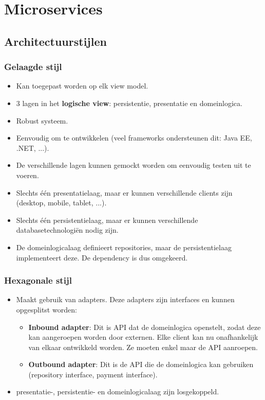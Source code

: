 \part{Microservices}
	\chapter{Architectuurstijlen}
	
	\section{Gelaagde stijl}
		\begin{itemize}
			\item Kan toegepast worden op elk view model.
			\item 3 lagen in het \textbf{logische view}: persistentie, presentatie en domeinlogica.
			\item[\good] Robust systeem.
			\item[\good] Eenvoudig om te ontwikkelen (veel frameworks ondersteunen dit: Java EE, .NET, ...).
			\item[\good] De verschillende lagen kunnen gemockt worden om eenvoudig testen uit te voeren.
			\item[\alert] Slechts één presentatielaag, maar er kunnen verschillende clients zijn (desktop, mobile, tablet, ...).
			\item[\alert] Slechts één persistentielaag, maar er kunnen verschillende databasetechnologiën nodig zijn.
			\item[\alert] De domeinlogicalaag definieert repositories, maar de persistentielaag implementeert deze. De dependency is dus omgekeerd.
		\end{itemize}
	\section{Hexagonale stijl}
		\begin{itemize}
			\item Maakt gebruik van adapters. Deze adapters zijn interfaces en kunnen opgesplitst worden:
			\begin{itemize}
				\item \textbf{Inbound adapter}: Dit is API dat de domeinlogica openstelt, zodat deze kan aangeroepen worden door externen. Elke client kan nu onafhankelijk van elkaar ontwikkeld worden. Ze moeten enkel maar de API aanroepen.
				\item \textbf{Outbound adapter}: Dit is de API die de domeinlogica kan gebruiken (repository interface, payment interface).
			\end{itemize}
			\item[\good] presentatie-, persistentie- en domeinlogicalaag zijn losgekoppeld.
		\end{itemize}
